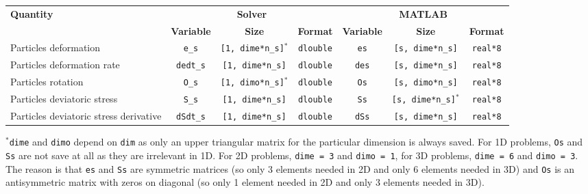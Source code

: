 {\scriptsize
\begin{tabular}{|l|c|c|c|c|c|c|}%
\hline
\multirow{2}{*}{\bf Quantity} & \multicolumn{3}{c|}{\bf Solver} &\multicolumn{3}{c|}{\bf MATLAB} \\ \cline{2-7}
& {\bf Variable} & {\bf Size} & {\bf Format} & {\bf Variable} & {\bf Size} & {\bf Format} \\ \hline
Particles deformation & \texttt{e\_s} & \texttt{[1, dime*n\_s]}$^*$ & \texttt{dlouble} & \texttt{es} & \texttt{[s, dime*n\_s]} & \texttt{real*8} \\ \hline
Particles deformation rate & \texttt{dedt\_s} & \texttt{[1, dime*n\_s]} & \texttt{dlouble} & \texttt{des} & \texttt{[s, dime*n\_s]} & \texttt{real*8} \\ \hline
Particles rotation & \texttt{O\_s} & \texttt{[1, dimo*n\_s]}$^*$ & \texttt{dlouble} & \texttt{Os} & \texttt{[s, dimo*n\_s]} & \texttt{real*8} \\ \hline
Particles deviatoric stress & \texttt{S\_s} & \texttt{[1, dime*n\_s]} & \texttt{dlouble} & \texttt{Ss} & \texttt{[s, dime*n\_s]}$^*$ & \texttt{real*8} \\ \hline
Particles deviatoric stress derivative & \texttt{dSdt\_s} & \texttt{[1, dime*n\_s]} & \texttt{dlouble} & \texttt{dSs} & \texttt{[s, dime*n\_s]} & \texttt{real*8} \\ \hline
\end{tabular}
}

$^*$\texttt{dime} and \texttt{dimo} depend on \texttt{dim} as only an upper triangular matrix for the particular dimension is always saved. For 1D problems, \texttt{Os} and \texttt{Ss} are not save at all as they are irrelevant in 1D. For 2D problems, \texttt{dime = 3} and \texttt{dimo = 1}, for 3D problems, \texttt{dime = 6} and \texttt{dimo = 3}. The reason is that \texttt{es} and \texttt{Ss} are symmetric matrices (so only 3 elements needed in 2D and only 6 elements needed in 3D) and \texttt{Os} is an antisymmetric matrix with zeros on diagonal (so only 1 element needed in 2D and only 3 elements needed in 3D).

